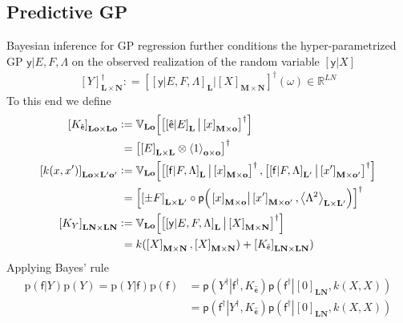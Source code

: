 \documentclass[preprint,12pt]{elsarticle}
\newcommand*{\M}[1]{\ensuremath{#1}\xspace}
\newcommand*{\x}{\times}
\newcommand*{\mi}[1]{\mathbf{#1}}
\newcommand*{\st}[1]{\mathbb{#1}}
\newcommand*{\rv}[1]{\mathsf{#1}}
\newcommand*{\te}[2][]{\left\lbrack{#2}\right\rbrack_{#1}}
\newcommand*{\diag}[2][]{\left\langle{#2}\right\rangle_{#1}}
\newcommand*{\prob}[3]{\M{\mathsf{p}\!\left(\left.{#1}\right\vert{#2,#3}\right)}}
\newcommand*{\deq}{\M{\mathrel{\mathop:}=}}
\newcommand*{\cov}[3][]{\ifthenelse{\equal{#1}{}}{\mathbb{V}_{#3}\!\left\lbrack{#2}\right\rbrack}{\mathbb{V}_{#3}\!\left\lbrack{#2,#1}\right\rbrack}}
\begin{document}
    \subsection{Predictive GP} \label{sub:GP:Predictive}
        Bayesian inference for GP regression further conditions the hyper-parametrized GP $\rv{y} \vert E,F,\Lambda$ on the observed realization of the random variable $\te{\rv{y}\vert X}$
        \begin{equation*}
            \te[\mi{L} \x \mi{N}]{Y}^{\dagger} \deq \te{\te[\mi{L}]{\rv{y}\vert E,F,\Lambda} \big\vert \te[\mi{M}\x\mi{N}]{X}}^{\dagger}\!(\omega) \in \st{R}^{LN}
        \end{equation*}
        To this end we define
        \begin{equation} \label{def:GP:Kk}
            \begin{aligned}
                \te[\mi{Lo}\x\mi{Lo}]{K_{\rv{\hat{e}}}} &\deq 
                \cov{\te{\te[\mi{L}]{\rv{\hat{e}}\vert E} \big\vert \te[\mi{M}\x\mi{o}]{x}}^{\dagger}}{\mi{Lo}} \\
                &\phantom{:}= \te{\te[\mi{L}\x\mi{L}]{E} \otimes \diag[\mi{o}\x\mi{o}]{1}}^{\dagger} \\
                \te[\mi{Lo}\x\mi{L^{\prime}o^{\prime}}]{k(x, x^{\prime})} &\deq
                \cov[{\te{\te[\mi{L^{\prime}}]{\rv{f}\vert F,\Lambda} \big\vert \te[\mi{M}\x\mi{o^{\prime}}]{x^{\prime}}}^{\dagger}}]
                {\te{\te[\mi{L}]{\rv{f}\vert F,\Lambda} \big\vert \te[\mi{M}\x\mi{o}]{x}}^{\dagger}}{\mi{Lo}} \\
                &\phantom{:}= \te{\te[\mi{L}\x\mi{L^{\prime}}]{\pm F} \circ 
                \prob{\te[\mi{M}\x\mi{o}]{x}}{\te[\mi{M}\x\mi{o^{\prime}}]{x^{\prime}}}
                {\diag[\mi{L}\x\mi{L^{\prime}}]{\Lambda^{2}}}}^{\dagger} \\
                \te[\mi{LN}\x\mi{LN}]{K_{Y}} &\deq 
                \cov{\te{\te[\mi{L}]{\rv{y}\vert E,F,\Lambda} \big\vert \te[\mi{M}\x\mi{N}]{X}}^{\dagger}}{\mi{Lo}} \\
                &\phantom{:}= k(\te[\mi{M}\x\mi{N}]{X},\te[\mi{M}\x\mi{N}]{X}) + \te[\mi{LN}\x\mi{LN}]{K_{\rv{\hat{e}}}})
            \end{aligned}
        \end{equation}
        Applying Bayes' rule
        \begin{equation*}
            \begin{aligned}
                \mathrm{p}(\rv{f}\vert Y)\mathrm{p}(Y) = \mathrm{p}(Y\vert \rv{f})\mathrm{p}(\rv{f})
                &= \prob{Y^{\dagger}}{\rv{f}^{\dagger}}{K_{\rv{\hat{e}}}} \prob{\rv{f}^{\dagger}}{\te[\mi{LN}]{0}}{k(X,X)} \\
                &= \prob{\rv{f}^{\dagger}}{Y^{\dagger}}{K_{\rv{\hat{e}}}} \prob{\rv{f}^{\dagger}}{\te[\mi{LN}]{0}}{k(X,X)}
            \end{aligned}
        \end{equation*}
\end{document}
